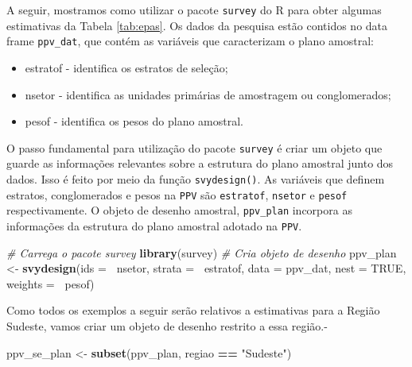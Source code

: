 \documentclass[]{book}
\newenvironment{Shaded}{\begin{snugshade}}{\end{snugshade}}
\newcommand{\KeywordTok}[1]{\textcolor[rgb]{0.13,0.29,0.53}{\textbf{#1}}}
\newcommand{\DataTypeTok}[1]{\textcolor[rgb]{0.13,0.29,0.53}{#1}}
\newcommand{\StringTok}[1]{\textcolor[rgb]{0.31,0.60,0.02}{#1}}
\newcommand{\CommentTok}[1]{\textcolor[rgb]{0.56,0.35,0.01}{\textit{#1}}}
\newcommand{\OtherTok}[1]{\textcolor[rgb]{0.56,0.35,0.01}{#1}}
\newcommand{\OperatorTok}[1]{\textcolor[rgb]{0.81,0.36,0.00}{\textbf{#1}}}
\newcommand{\NormalTok}[1]{#1}
\providecommand{\tightlist}{%
  \setlength{\itemsep}{0pt}\setlength{\parskip}{0pt}}
\theoremstyle{definition}
\theoremstyle{definition}
\theoremstyle{definition}
\theoremstyle{remark}
\begin{document}
A seguir, mostramos como utilizar o pacote \texttt{survey}
\citep{R-survey} do R para obter algumas estimativas da Tabela
\ref{tab:epas}. Os dados da pesquisa estão contidos no data frame
\texttt{ppv\_dat}, que contém as variáveis que caracterizam o plano
amostral:

\begin{itemize}
\tightlist
\item
  estratof - identifica os estratos de seleção;
\item
  nsetor - identifica as unidades primárias de amostragem ou
  conglomerados;
\item
  pesof - identifica os pesos do plano amostral.
\end{itemize}

O passo fundamental para utilização do pacote \texttt{survey}
\citep{R-survey} é criar um objeto que guarde as informações relevantes
sobre a estrutura do plano amostral junto dos dados. Isso é feito por
meio da função \texttt{svydesign()}. As variáveis que definem estratos,
conglomerados e pesos na \texttt{PPV} são \texttt{estratof},
\texttt{nsetor} e \texttt{pesof} respectivamente. O objeto de desenho
amostral, \texttt{ppv\_plan} incorpora as informações da estrutura do
plano amostral adotado na \texttt{PPV}.

\begin{Shaded}
\begin{Highlighting}[]
\CommentTok{# Carrega o pacote survey}
\KeywordTok{library}\NormalTok{(survey)}
\CommentTok{# Cria objeto de desenho}
\NormalTok{ppv_plan <-}\StringTok{ }\KeywordTok{svydesign}\NormalTok{(}\DataTypeTok{ids =} \OperatorTok{~}\NormalTok{nsetor, }\DataTypeTok{strata =} \OperatorTok{~}\NormalTok{estratof, }\DataTypeTok{data =}\NormalTok{ ppv_dat, }
                      \DataTypeTok{nest =} \OtherTok{TRUE}\NormalTok{, }\DataTypeTok{weights =} \OperatorTok{~}\NormalTok{pesof)}
\end{Highlighting}
\end{Shaded}

Como todos os exemplos a seguir serão relativos a estimativas para a
Região Sudeste, vamos criar um objeto de desenho restrito a essa
região.-

\begin{Shaded}
\begin{Highlighting}[]
\NormalTok{ppv_se_plan <-}\StringTok{ }\KeywordTok{subset}\NormalTok{(ppv_plan, regiao }\OperatorTok{==}\StringTok{ "Sudeste"}\NormalTok{)}
\end{Highlighting}
\end{Shaded}
\end{document}
